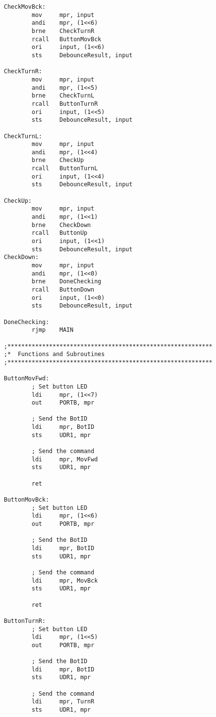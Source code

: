 \documentclass[12pt,letterpaper]{article}
\begin{document}
\begin{verbatim}
CheckMovBck:
        mov     mpr, input
        andi    mpr, (1<<6)
        brne    CheckTurnR
        rcall   ButtonMovBck
        ori     input, (1<<6)
        sts     DebounceResult, input

CheckTurnR:
        mov     mpr, input
        andi    mpr, (1<<5)
        brne    CheckTurnL
        rcall   ButtonTurnR
        ori     input, (1<<5)
        sts     DebounceResult, input

CheckTurnL:
        mov     mpr, input
        andi    mpr, (1<<4)
        brne    CheckUp
        rcall   ButtonTurnL
        ori     input, (1<<4)
        sts     DebounceResult, input

CheckUp:
        mov     mpr, input
        andi    mpr, (1<<1)
        brne    CheckDown
        rcall   ButtonUp
        ori     input, (1<<1)
        sts     DebounceResult, input
CheckDown:
        mov     mpr, input
        andi    mpr, (1<<0)
        brne    DoneChecking
        rcall   ButtonDown
        ori     input, (1<<0)
        sts     DebounceResult, input

DoneChecking:
        rjmp    MAIN

;***********************************************************
;*  Functions and Subroutines
;***********************************************************

ButtonMovFwd:
        ; Set button LED
        ldi     mpr, (1<<7)
        out     PORTB, mpr

        ; Send the BotID
        ldi     mpr, BotID
        sts     UDR1, mpr

        ; Send the command
        ldi     mpr, MovFwd
        sts     UDR1, mpr

        ret

ButtonMovBck:
        ; Set button LED
        ldi     mpr, (1<<6)
        out     PORTB, mpr

        ; Send the BotID
        ldi     mpr, BotID
        sts     UDR1, mpr

        ; Send the command
        ldi     mpr, MovBck
        sts     UDR1, mpr

        ret

ButtonTurnR:
        ; Set button LED
        ldi     mpr, (1<<5)
        out     PORTB, mpr

        ; Send the BotID
        ldi     mpr, BotID
        sts     UDR1, mpr

        ; Send the command
        ldi     mpr, TurnR
        sts     UDR1, mpr


\end{verbatim}
\end{document}
